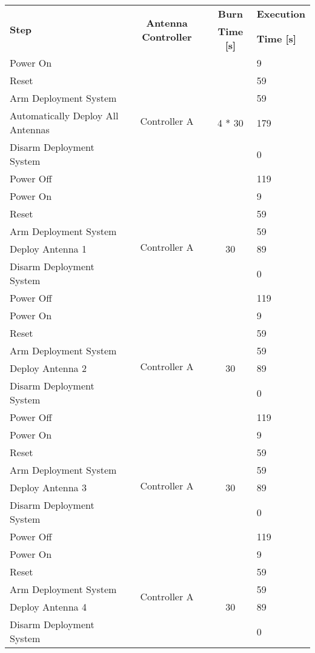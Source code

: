 \begin{longtable}{l|c|c|l}
    \toprule
    \multirow{2}{*}{\textbf{Step}} & \multirow{2}{*}{\textbf{Antenna Controller}} & \textbf{Burn} & \textbf{Execution} \\
    & & \textbf{Time [s]} & \textbf{Time [s]} \\
    \midrule
    \endhead
    Power On & \multirow{6}{*}{Controller A} & & 9 \\
    Reset & & & 59 \\
    Arm Deployment System & & & 59 \\
    Automatically Deploy All Antennas & &  4 * 30 & 179 \\
    Disarm Deployment System & & & 0 \\
    Power Off & & & 119 \\
    \hline
    Power On & \multirow{6}{*}{Controller A} & & 9 \\
    Reset & & & 59 \\
    Arm Deployment System & & & 59 \\
    Deploy Antenna 1 & & 30 & 89 \\
    Disarm Deployment System & & & 0 \\
    Power Off & & & 119 \\
    \hline
    Power On & \multirow{6}{*}{Controller A} & & 9 \\
    Reset & & & 59 \\
    Arm Deployment System & & & 59 \\
    Deploy Antenna 2 & & 30 & 89 \\
    Disarm Deployment System & & & 0 \\
    Power Off & & & 119 \\
    \hline
    Power On & \multirow{6}{*}{Controller A} & & 9 \\
    Reset & & & 59 \\
    Arm Deployment System & & & 59 \\
    Deploy Antenna 3 & & 30 & 89 \\
    Disarm Deployment System & & & 0 \\
    Power Off & & & 119 \\
    \hline
    Power On & \multirow{6}{*}{Controller A} & & 9 \\
    Reset & & & 59 \\
    Arm Deployment System & & & 59 \\
    Deploy Antenna 4 & & 30 & 89 \\
    Disarm Deployment System & & & 0 \\

\end{longtable}
